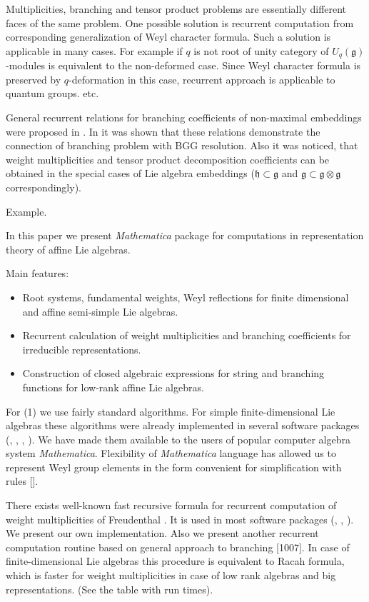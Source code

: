 \documentclass[12pt]{article}
\theoremstyle{definition}
\newcommand{\gf}{\mathfrak{g}}
\newcommand{\hf}{\mathfrak{h}}
\begin{document}
Multiplicities, branching and tensor product problems are essentially different faces of the same problem. One possible solution is recurrent computation from corresponding generalization of Weyl character formula. Such a solution is applicable in many cases. For example if $q$ is not root of unity category of $U_{q}(\gf)$-modules is equivalent to the non-deformed case.  Since Weyl character formula is preserved by $q$-deformation in this case, recurrent approach is applicable to quantum groups. etc.

General recurrent relations for branching coefficients of non-maximal embeddings were proposed in \cite{2010arXiv1007.0318L}. In \cite{2011arXiv1102.1702L} it was shown that these relations demonstrate the connection of branching problem with BGG resolution. Also it was noticed, that weight multiplicities and tensor product decomposition coefficients can be obtained in the special cases of Lie algebra embeddings ($\hf\subset\gf$ and $\gf\subset\gf\otimes\gf$ correspondingly).

Example.

In this paper we present {\it Mathematica} package for computations in representation theory of affine Lie algebras. 

Main features:
\begin{itemize}
\item Root systems, fundamental weights, Weyl reflections for finite dimensional and affine semi-simple Lie algebras.
\item Recurrent calculation of weight multiplicities and branching coefficients for irreducible representations.
\item Construction of closed algebraic expressions for string and branching functions for low-rank affine Lie algebras.
\end{itemize}

For (1) we use fairly standard algorithms. For simple finite-dimensional Lie algebras these algorithms were already implemented in several software packages (\cite{vanleeuwen1994lsp}, \cite{stembridge2001computational}, \cite{fischbacher2002ilp}, \cite{simplie}). We have made them available to the users of popular computer algebra system {\it Mathematica}. Flexibility of {\it Mathematica} language has allowed us to represent Weyl group elements in the form convenient for simplification with rules []. 

There exists well-known fast recursive formula for recurrent computation of weight multiplicities of Freudenthal \cite{moody1982fast}. It is used in most software packages (\cite{vanleeuwen1994lsp}, \cite{stembridge2001computational}, \cite{fischbacher2002ilp}). We present our own implementation. Also we present another recurrent computation routine based on general approach to branching [1007]. In case of finite-dimensional Lie algebras this procedure is equivalent to Racah formula, which is faster for weight multiplicities in case of low rank algebras and big representations. (See the table with run times). 
\end{document}
